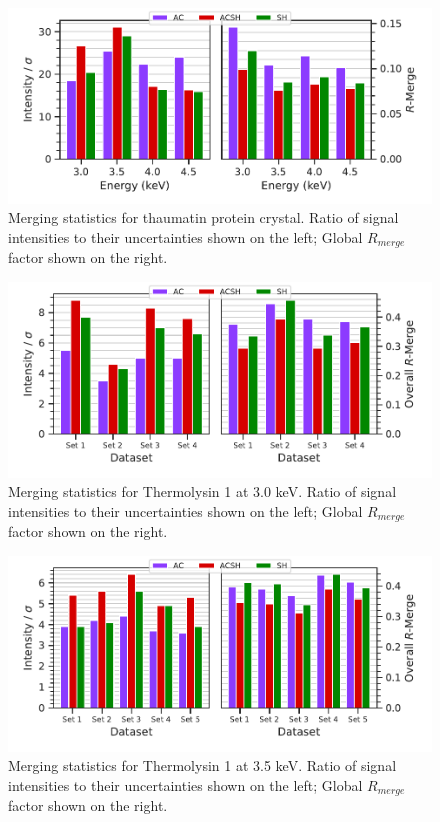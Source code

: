 \begin{figure}[h]
    \centering
    \includegraphics{plots/exp0/thaum_stats_grid.pdf}
    \caption{Merging statistics for thaumatin protein crystal. Ratio of signal intensities to their uncertainties shown on the left; Global $R_{merge}$ factor shown on the right.}
    \label{fig:thaum1_stats}
\end{figure}


\newpage

\begin{figure}
    \centering
    \includegraphics{plots/exp1/tlys_9_P6122/3p0_stats_grid.pdf}
    \caption{Merging statistics for Thermolysin 1 at 3.0 \unit{keV}. Ratio of signal intensities to their uncertainties shown on the left; Global $R_{merge}$ factor shown on the right.}
    \label{fig:tlys_9_3p0}
\end{figure}

\begin{figure}
    \centering
    \includegraphics{plots/exp1/tlys_9_P6122/3p5_stats_grid.pdf}
    \caption{Merging statistics for Thermolysin 1 at 3.5 \unit{keV}. Ratio of signal intensities to their uncertainties shown on the left; Global $R_{merge}$ factor shown on the right.}
    \label{fig:tlys_9_3p5}
\end{figure}


